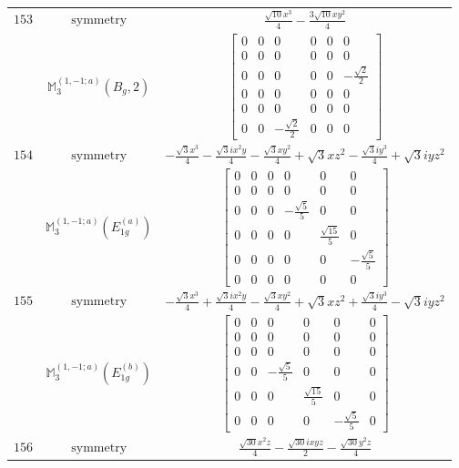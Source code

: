 \documentclass[fleqn,8pt,landscape]{jsarticle}
\begin{document}
\begin{longtable}{ccc}
$ 153 $ & $ \text{symmetry} $ & $ \frac{\sqrt{10} x^{3}}{4} - \frac{3 \sqrt{10} x y^{2}}{4} $ \\
$  $ & $ \mathbb{M}_{3}^{(1,-1;a)}(B_{g},2) $ & $ \begin{bmatrix} 0 & 0 & 0 & 0 & 0 & 0 \\ 0 & 0 & 0 & 0 & 0 & 0 \\ 0 & 0 & 0 & 0 & 0 & - \frac{\sqrt{2}}{2} \\ 0 & 0 & 0 & 0 & 0 & 0 \\ 0 & 0 & 0 & 0 & 0 & 0 \\ 0 & 0 & - \frac{\sqrt{2}}{2} & 0 & 0 & 0 \end{bmatrix} $ \\ \hline
$ 154 $ & $ \text{symmetry} $ & $ - \frac{\sqrt{3} x^{3}}{4} - \frac{\sqrt{3} i x^{2} y}{4} - \frac{\sqrt{3} x y^{2}}{4} + \sqrt{3} x z^{2} - \frac{\sqrt{3} i y^{3}}{4} + \sqrt{3} i y z^{2} $ \\
$  $ & $ \mathbb{M}_{3}^{(1,-1;a)}(E_{1g}^{(a)}) $ & $ \begin{bmatrix} 0 & 0 & 0 & 0 & 0 & 0 \\ 0 & 0 & 0 & 0 & 0 & 0 \\ 0 & 0 & 0 & - \frac{\sqrt{5}}{5} & 0 & 0 \\ 0 & 0 & 0 & 0 & \frac{\sqrt{15}}{5} & 0 \\ 0 & 0 & 0 & 0 & 0 & - \frac{\sqrt{5}}{5} \\ 0 & 0 & 0 & 0 & 0 & 0 \end{bmatrix} $ \\ \hline
$ 155 $ & $ \text{symmetry} $ & $ - \frac{\sqrt{3} x^{3}}{4} + \frac{\sqrt{3} i x^{2} y}{4} - \frac{\sqrt{3} x y^{2}}{4} + \sqrt{3} x z^{2} + \frac{\sqrt{3} i y^{3}}{4} - \sqrt{3} i y z^{2} $ \\
$  $ & $ \mathbb{M}_{3}^{(1,-1;a)}(E_{1g}^{(b)}) $ & $ \begin{bmatrix} 0 & 0 & 0 & 0 & 0 & 0 \\ 0 & 0 & 0 & 0 & 0 & 0 \\ 0 & 0 & 0 & 0 & 0 & 0 \\ 0 & 0 & - \frac{\sqrt{5}}{5} & 0 & 0 & 0 \\ 0 & 0 & 0 & \frac{\sqrt{15}}{5} & 0 & 0 \\ 0 & 0 & 0 & 0 & - \frac{\sqrt{5}}{5} & 0 \end{bmatrix} $ \\ \hline
$ 156 $ & $ \text{symmetry} $ & $ \frac{\sqrt{30} x^{2} z}{4} - \frac{\sqrt{30} i x y z}{2} - \frac{\sqrt{30} y^{2} z}{4} $ \\

\end{longtable}
\end{document}
